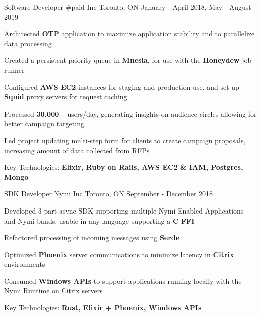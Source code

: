 

\begin{cventries}

  \cventry
    {Software Developer} %
    {\#paid Inc} %
    {Toronto, ON} %
    {January - April 2018, May - August 2019} %
    {
      \begin{cvitems} %
        \item {Architected \textbf{OTP} application to maximize application stability and to parallelize data processing}
        \item {Created a persistent priority queue in \textbf{Mnesia}, for use with the \textbf{Honeydew} job runner}
        \item {Configured \textbf{AWS EC2} instances for staging and production use, and set up \textbf{Squid} proxy servers for request caching}
        \item {Processed \textbf{30,000+} users/day, generating insights on audience circles allowing for better campaign targeting}
        \item {Led project updating multi-step form for clients to create campaign proposals, increasing amount of data collected from RFPs}
        \item {Key Technologies: \textbf{Elixir, Ruby on Rails, AWS EC2 \& IAM, Postgres, Mongo}}
      \end{cvitems}
    }

  \cventry
    {SDK Developer} %
    {Nymi Inc} %
    {Toronto, ON} %
    {September - December 2018} %
    {
      \begin{cvitems} %
        \item {Developed 3-part async SDK supporting multiple Nymi Enabled Applications and Nymi bands, usable in any language supporting a \textbf{C FFI}}
        \item {Refactored processing of incoming messages using \textbf{Serde}}
        \item {Optimized \textbf{Phoenix} server communications to minimize latency in \textbf{Citrix} environments}
        \item {Consumed \textbf{Windows APIs} to support applications running locally with the Nymi Runtime on Citrix servers}
        \item {Key Technologies: \textbf{Rust, Elixir + Phoenix, Windows APIs}}
      \end{cvitems}
    }

\end{cventries}
